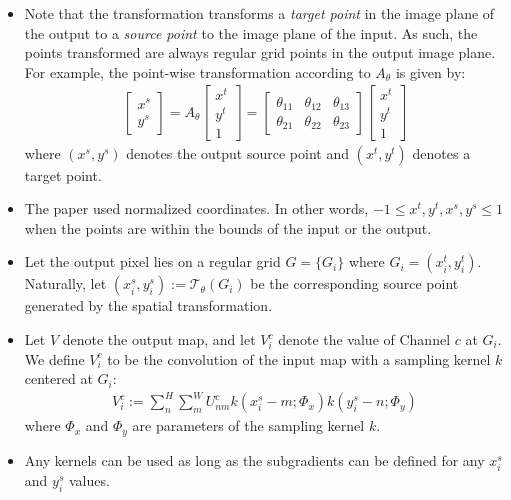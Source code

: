 \documentclass[10pt]{article}
\newcommand{\mc}[1]{\mathcal{#1}}
\begin{document}
\begin{itemize}
 	\item Note that the transformation transforms a \emph{target point} in the image plane of the output to a \emph{source point} to the image plane of the input. As such, the points transformed are always regular grid points in the output image plane. For example, the point-wise transformation according to $A_\theta$ is given by:
 	\begin{align*}
 		\begin{bmatrix}
 			x^s \\ y^s
 		\end{bmatrix}
 		= A_\theta \begin{bmatrix}
 			x^t \\ y^t \\ 1
 		\end{bmatrix}
 	    = \begin{bmatrix}
 			\theta_{11} & \theta_{12} & \theta_{13} \\
 			\theta_{21} & \theta_{22} & \theta_{23}
 		\end{bmatrix}
 		\begin{bmatrix}
 			x^t \\ y^t \\ 1
 		\end{bmatrix}
 	\end{align*}
 	where $(x^s, y^s)$ denotes the output source point and $(x^t, y^t)$ denotes a target point.

 	\item The paper used normalized coordinates. In other words, $-1 \leq x^t, y^t, x^s, y^s \leq 1$ when the points are within the bounds of the input or the output.

 	\item Let the output pixel lies on a regular grid $G = \{ G_i \}$ where $G_i = (x^t_i, y^t_i)$. Naturally, let $(x^s_i, y^s_i) := \mc{T}_\theta(G_i)$ be the corresponding source point generated by the spatial transformation.

 	\item Let $V$ denote the output map, and let $V^c_i$ denote the value of Channel $c$ at $G_i$. We define $V^c_i$ to be the convolution of the input map with a sampling kernel $k$ centered at $G_i$:
 	\begin{align*}
 		V_i^c := \sum_{n}^H \sum_{m}^W U_{nm}^c k(x_i^s - m; \Phi_x) k(y_i^s -n; \Phi_y)
 	\end{align*}
 	where $\Phi_x$ and $\Phi_y$ are parameters of the sampling kernel $k$.

 	\item Any kernels can be used as long as the subgradients can be defined for any $x_i^s$ and $y_i^s$ values.


\end{itemize}
\end{document}
